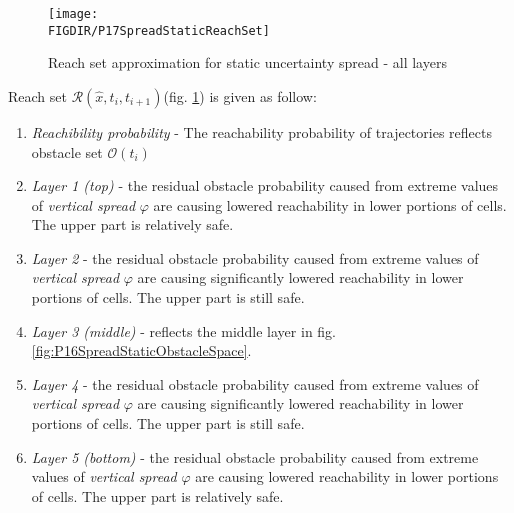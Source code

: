 \begin{figure}[H]
    \centering
    \texttt{[image: \\FIGDIR/P17SpreadStaticReachSet]}
    \caption{Reach set approximation for static uncertainty spread - all layers}
    \label{fig:P17SpreadStaticReachSet}
\end{figure}

\noindent Reach set $\mathscr{R}(\hat{x},t_i,t_{i+1})$(fig. \ref{fig:P17SpreadStaticReachSet}) is given as follow:
\begin{enumerate}
    \item\emph{Reachibility probability} - The reachability probability of trajectories reflects obstacle set $\mathscr{O}(t_i)$
    \item\emph{Layer 1 (top)} - the residual obstacle probability caused from extreme values of \emph{vertical spread} $\varphi$ are causing lowered reachability in lower portions of cells. The upper part is relatively safe.
    \item\emph{Layer 2} - the residual obstacle probability caused from extreme values of \emph{vertical spread} $\varphi$ are causing significantly lowered reachability in lower portions of cells. The upper part is still safe.
    \item\emph{Layer 3 (middle)} - reflects the middle layer in fig. \ref{fig:P16SpreadStaticObstacleSpace}. 
    \item\emph{Layer 4} - the residual obstacle probability caused from extreme values of \emph{vertical spread} $\varphi$ are causing significantly lowered reachability in lower portions of cells. The upper part is still safe.
    \item\emph{Layer 5 (bottom)} - the residual obstacle probability caused from extreme values of \emph{vertical spread} $\varphi$ are causing lowered reachability in lower portions of cells. The upper part is relatively safe.
\end{enumerate}



